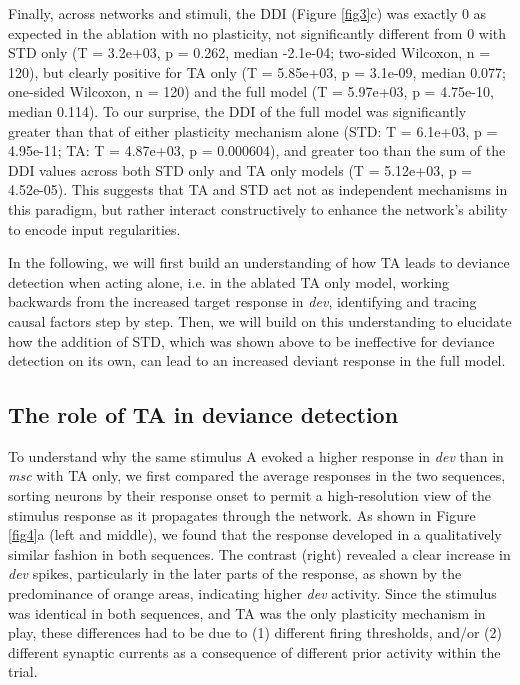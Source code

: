 \documentclass[pdflatex,referee,iicol,sn-basic]{sn-jnl}
\newcommand{\dev}{\textit{dev}}
\newcommand{\msc}{\textit{msc}}
\theoremstyle{thmstyleone}%
\theoremstyle{thmstyletwo}%
\theoremstyle{thmstylethree}%
\begin{document}
Finally, across networks and stimuli, the DDI (Figure \ref{fig3}c) was exactly 0 as expected in the ablation with no plasticity, not significantly different from 0 with STD only (T = 3.2e+03, p = 0.262, median -2.1e-04; two-sided Wilcoxon, n = 120), but clearly positive for TA only (T = 5.85e+03, p = 3.1e-09, median 0.077; one-sided Wilcoxon, n = 120) and the full model (T = 5.97e+03, p = 4.75e-10, median 0.114). To our surprise, the DDI of the full model was significantly greater than that of either plasticity mechanism alone (STD: T = 6.1e+03, p = 4.95e-11; TA: T = 4.87e+03, p = 0.000604), and greater too than the sum of the DDI values across both STD only and TA only models (T = 5.12e+03, p = 4.52e-05). This suggests that TA and STD act not as independent mechanisms in this paradigm, but rather interact constructively to enhance the network's ability to encode input regularities.

In the following, we will first build an understanding of how TA leads to deviance detection when acting alone, i.e. in the ablated TA only model, working backwards from the increased target response in \dev{}, identifying and tracing causal factors step by step. Then, we will build on this understanding to elucidate how the addition of STD, which was shown above to be ineffective for deviance detection on its own, can lead to an increased deviant response in the full model.

\subsection{The role of TA in deviance detection}\label{sec-ta}

To understand why the same stimulus A evoked a higher response in \dev{} than in \msc{} with TA only, we first compared the average responses in the two sequences, sorting neurons by their response onset to permit a high-resolution view of the stimulus response as it propagates through the network. As shown in Figure \ref{fig4}a (left and middle), we found that the response developed in a qualitatively similar fashion in both sequences. The contrast (right) revealed a clear increase in \dev{} spikes, particularly in the later parts of the response, as shown by the predominance of orange areas, indicating higher \dev{} activity. Since the stimulus was identical in both sequences, and TA was the only plasticity mechanism in play, these differences had to be due to (1) different firing thresholds, and/or (2) different synaptic currents as a consequence of different prior activity within the trial.
\end{document}
